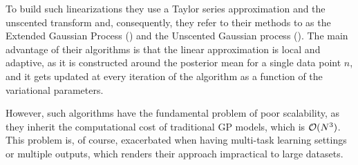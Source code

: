 To build such linearizations they use a Taylor series approximation and the unscented transform 
and, consequently, they refer to their methods to as the Extended Gaussian Process (\egp) and 
the Unscented Gaussian process (\ugp). 
The main advantage of their algorithms is that the linear
approximation is local and adaptive, as it is constructed around the posterior mean for a
single data point $n$, and it gets updated at every iteration of the algorithm as a function
of the variational parameters. 

However, such algorithms have the fundamental problem of poor scalability, as they 
inherit the computational cost of traditional GP models, which is $\mathcal{O}(N^3)$. This 
problem is, of course, exacerbated when having multi-task learning settings or multiple
outputs, which renders their approach impractical to large datasets.  


